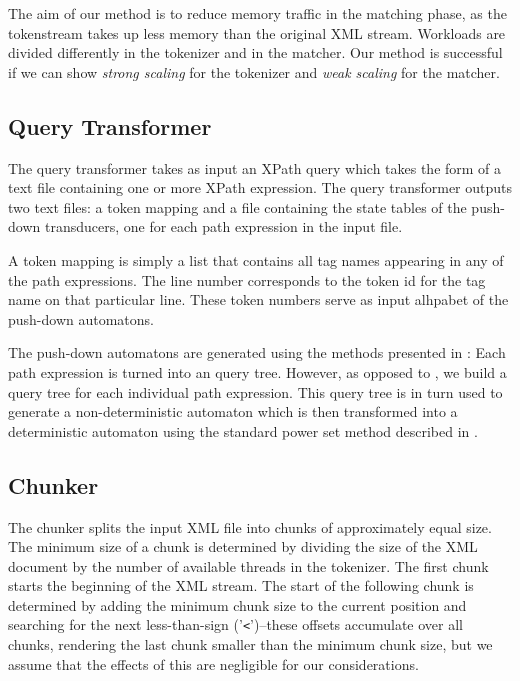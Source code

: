 The aim of our method is to reduce memory traffic in the matching phase, as the
tokenstream takes up less memory than the original XML stream. Workloads are
divided differently in the tokenizer and in the matcher. Our method is
successful if we can show \emph{strong scaling} for the tokenizer and \emph{weak
scaling} for the matcher.

\subsection{Query Transformer}

The query transformer takes as input an XPath query which takes the form of a
text file containing one or more XPath expression. The query transformer outputs
two text files: a token mapping and a file containing the state tables of
the push-down transducers, one for each path expression in the input file.

A token mapping is simply a list that contains all tag names appearing in any
of the path expressions. The line number corresponds to the token id for the
tag name on that particular line. These token numbers serve as input alhpabet
of the push-down automatons.

The push-down automatons are generated using the methods presented in : Each path expression is turned into an query tree. However,
as opposed to , we build a query tree for each
individual path expression. This query tree is in turn used to generate a
non-deterministic automaton which is then transformed into a deterministic
automaton using the standard power set method described in .

\subsection{Chunker}

The chunker splits the input XML file into chunks of approximately equal size.
The minimum size of a chunk is determined by dividing the size of the XML
document by the number of available threads in the tokenizer. The first chunk
starts the beginning of the XML stream. The start of the following chunk is
determined by adding the minimum chunk size to the current position and
searching for the next less-than-sign ('\texttt{<}')–these offsets accumulate over
all chunks, rendering the last chunk smaller than the minimum chunk size, but we
assume that the effects of this are negligible for our considerations.

